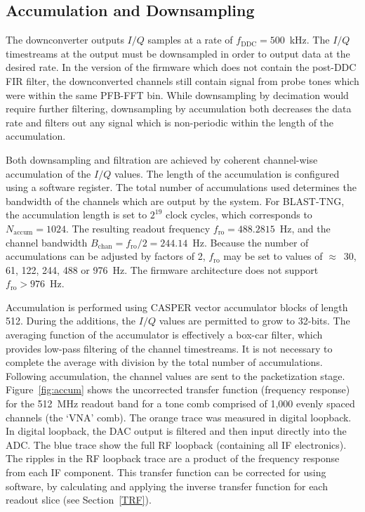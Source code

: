 \subsection{Accumulation and Downsampling}\label{accum}

The downconverter outputs $I/Q$ samples at a rate of $f_{\mathrm{DDC}} = 500$~kHz. The $I/Q$ timestreams at the output must be downsampled in order to output data at the desired rate. In the version of the firmware which does not contain the post-DDC FIR filter, the downconverted channels still contain signal from probe tones which were within the same PFB-FFT bin. While downsampling by decimation would require further filtering, downsampling by accumulation both decreases the data rate and filters out any signal which is non-periodic within the length of the accumulation.

Both downsampling and filtration are achieved by coherent channel-wise accumulation of the $I/Q$ values. The length of the accumulation is configured using a software register. The total number of accumulations used determines the bandwidth of the channels which are output by the system. For BLAST-TNG, the accumulation length is set to $2^{19}$ clock cycles, which corresponds to $N_{\mathrm{accum}} = 1024$. The resulting readout frequency $f_{\mathrm{ro}} = 488.2815$~Hz, and the channel bandwidth $B_{\mathrm{chan}} = f_{\mathrm{ro}}/2 = 244.14$~Hz. Because the number of accumulations can be adjusted by factors of 2, $f_{\mathrm{ro}}$ may be set to values of $\approx$~30, 61, 122, 244, 488 or 976~Hz. The firmware architecture does not support $f_{\mathrm{ro}} > 976$~Hz.

Accumulation is performed using CASPER vector accumulator blocks of length 512. During the additions, the $I/Q$ values are permitted to grow to 32-bits. The averaging function of the accumulator is effectively a box-car filter, which provides low-pass filtering of the channel timestreams. It is not necessary to complete the average with division by the total number of accumulations. Following accumulation, the channel values are sent to the packetization stage. Figure~\ref{fig:accum} shows the uncorrected transfer function (frequency response) for the 512~MHz readout band for a tone comb comprised of 1,000 evenly spaced channels (the `VNA' comb). The orange trace was measured in digital loopback. In digital loopback, the DAC output is filtered and then input directly into the ADC\@. The blue trace show the full RF loopback (containing all IF electronics). The ripples in the RF loopback trace are a product of the frequency response from each IF component. This transfer function can be corrected for using software, by calculating and applying the inverse transfer function for each readout slice (see Section~\ref{TRF}).

